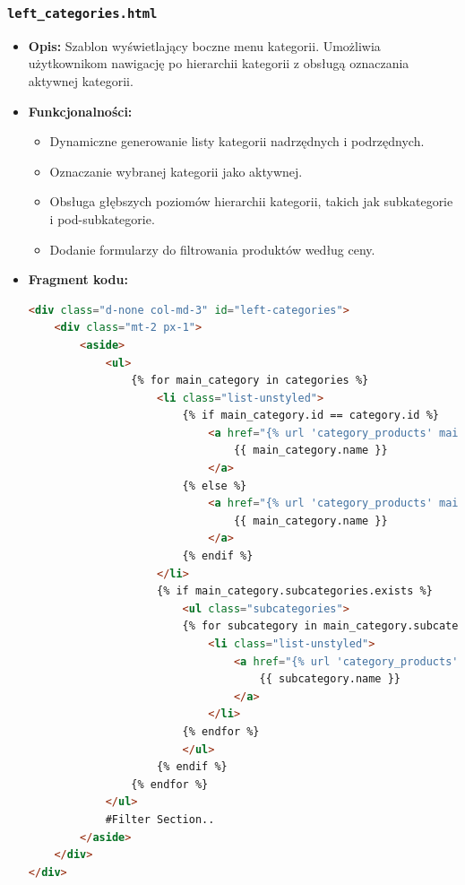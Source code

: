 \documentclass[12pt,a4paper,oneside]{article}
\theoremstyle{definition}
\numberwithin{equation}{section}
\begin{document}
\subsubsection*{\texttt{left\_categories.html}}
\begin{itemize}
    \item \textbf{Opis:}
    Szablon wyświetlający boczne menu kategorii. Umożliwia użytkownikom nawigację po hierarchii kategorii z obsługą oznaczania aktywnej kategorii.
    \item \textbf{Funkcjonalności:}
    \begin{itemize}
        \item Dynamiczne generowanie listy kategorii nadrzędnych i podrzędnych.
        \item Oznaczanie wybranej kategorii jako aktywnej.
        \item Obsługa głębszych poziomów hierarchii kategorii, takich jak 
            \subsubitem subkategorie i pod-subkategorie.
        \item Dodanie formularzy do filtrowania produktów według ceny.
    \end{itemize}
    \item \textbf{Fragment kodu:}
    \begin{lstlisting}[language=HTML, caption=Fragment szablonu left\_categories.html]
<div class="d-none col-md-3" id="left-categories">
    <div class="mt-2 px-1">
        <aside>
            <ul>
                {% for main_category in categories %}
                    <li class="list-unstyled">
                        {% if main_category.id == category.id %}
                            <a href="{% url 'category_products' main_category.id %}" class="active">
                                {{ main_category.name }}
                            </a>
                        {% else %}
                            <a href="{% url 'category_products' main_category.id %}">
                                {{ main_category.name }}
                            </a>
                        {% endif %}
                    </li>
                    {% if main_category.subcategories.exists %}
                        <ul class="subcategories">
                        {% for subcategory in main_category.subcategories.all %}
                            <li class="list-unstyled">
                                <a href="{% url 'category_products' subcategory.id %}" class="fw-bold">
                                    {{ subcategory.name }}
                                </a>
                            </li>
                        {% endfor %}
                        </ul>
                    {% endif %}
                {% endfor %}
            </ul>
            #Filter Section..
        </aside>
    </div>
</div>
    \end{lstlisting}
\end{itemize}
\end{document}
